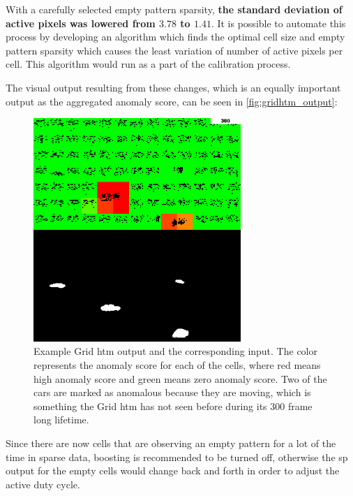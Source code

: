 With a carefully selected empty pattern sparsity, \textbf{the standard deviation of active pixels was lowered from $\mathbf{3.78}$ to $\mathbf{1.41}$}. It is possible to automate this process by developing an algorithm which finds the optimal cell size and empty pattern sparsity which causes the least variation of number of active pixels per cell. This algorithm would run as a part of the calibration process.\par
The visual output resulting from these changes, which is an equally important output as the aggregated anomaly score, can be seen in \autoref{fig:gridhtm_output}:
\begin{figure}[H]
    \centering
    \includegraphics[width=0.7\textwidth]{resources/methodology/htm_grid_output.png}
    \caption[Example Grid HTM Output]{Example Grid \gls*{htm} output and the corresponding input. The color represents the anomaly score for each of the cells, where red means high anomaly score and green means zero anomaly score. Two of the cars are marked as anomalous because they are moving, which is something the Grid \gls*{htm} has not seen before during its 300 frame long lifetime.}
    \label{fig:gridhtm_output}
\end{figure}
Since there are now cells that are observing an empty pattern for a lot of the time in sparse data, boosting is recommended to be turned off, otherwise the \gls*{sp} output for the empty cells would change back and forth in order to adjust the active duty cycle.
